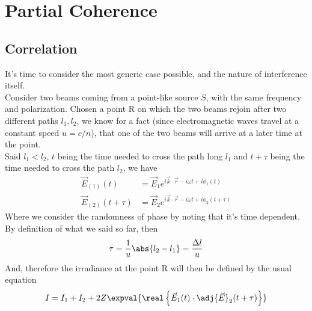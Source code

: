 \documentclass[../electromagnetism.tex]{subfiles}
\begin{document}
\section{Partial Coherence}
\subsection{Correlation}
It's time to consider the most generic case possible, and the nature of interference itself.\\
Consider two beams coming from a point-like source $S$, with the same frequency and polarization. Chosen a point R on which the two beams rejoin after two different paths $l_1, l_2$, we know for a fact (since electromagnetic waves travel at a constant speed $u=c/n$), that one of the two beams will arrive at a later time at the point.\\
Said $l_1<l_2$, $t$ being the time needed to cross the path long $l_1$ and $t+\tau$ being the time needed to cross the path $l_2$, we have
\begin{equation}
	\begin{aligned}
		\vec{E}_{(1)}(t)&= \vec{E}_1e^{i\vec{k}\cdot\vec{r}-i\omega t+i\phi_1(t)}\\
		\vec{E}_{(2)}(t+\tau)&= \vec{E}_2e^{i\vec{k}\cdot\vec{r}-i\omega t+i\phi_2(t+\tau)}
	\end{aligned}
	\label{eq:pcorre1e2.pcorr}
\end{equation}
Where we consider the randomness of phase by noting that it's time dependent.\\
By definition of what we said so far, then 
\begin{equation}
	\tau=\frac{1}{u}\abs{l_2-l_1}=\frac{\Delta l}{u}
	\label{eq:taudef.pcorr}
\end{equation}
And, therefore the irradiance at the point R will then be defined by the usual equation
\begin{equation*}
	I=I_1+I_2+2Z\expval{\real\left\{ \vec{E}_1(t)\cdot\adj{\vec{E}}_2(t+\tau) \right\}}
\end{equation*}
\end{document}
